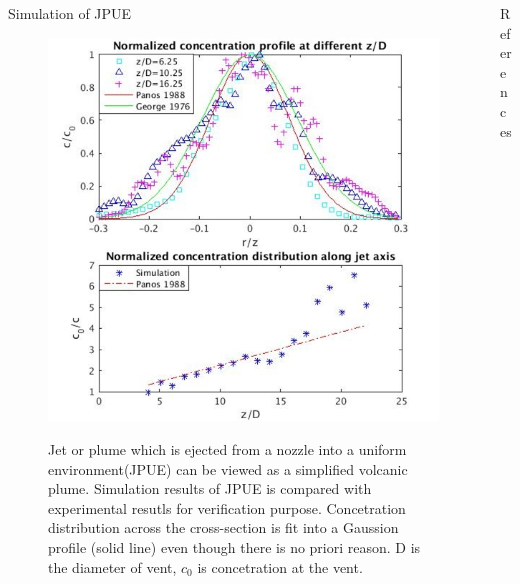 \documentclass[final]{beamer}
\newlength{\onecolwid}
\newlength{\twocolwid}
\begin{document}
\begin{frame}[t]
\begin{columns}[t]
\begin{column}{\twocolwid}
\begin{columns}[t,totalwidth=\twocolwid]
\begin{column}{\onecolwid}
\begin{block}{Simulation of JPUE}
\begin{figure}
\centering
{\includegraphics[height= 0.690\linewidth]{jpue_conc}}
\caption{Jet or plume which is ejected from a nozzle into a uniform environment(JPUE) can be viewed as a simplified volcanic plume. Simulation results of JPUE is compared with experimental resutls \cite{papanicolaou1988investigations, george1977turbulence} for verification purpose. Concetration distribution across the cross-section is fit into a Gaussion profile (solid line) even though there is no priori reason. D is the diameter of vent, $c_0$ is concetration at the vent.}
\end{figure}

\end{block}

\end{column} %

\begin{column}{\onecolwid}\vspace{-1.4in} 
\begin{alertblock}{References}

\small{
}

\end{alertblock}



\end{column}
\end{columns}
\end{column}
\end{columns}
\end{frame}
\end{document}
